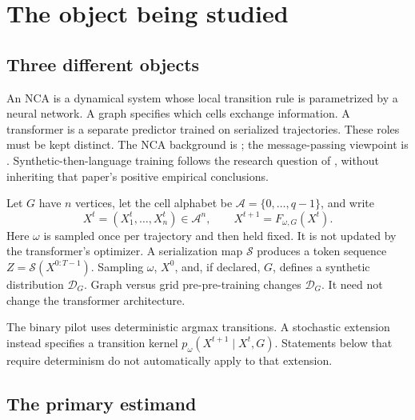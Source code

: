 \section{The object being studied}
\label{sec:problem}

\subsection{Three different objects}

An NCA is a dynamical system whose local transition rule is parametrized by a
neural network. A graph specifies which cells exchange information.
A transformer is a separate predictor trained on serialized trajectories.
These roles must be kept distinct. The NCA background is
\cite{mordvintsev2020}; the message-passing viewpoint is
\cite{gilmer2017}. Synthetic-then-language training follows the research
question of \cite{lee2026}, without inheriting that paper's positive
empirical conclusions.

Let $G$ have $n$ vertices, let the cell alphabet be
$\mathcal A=\{0,\ldots,q-1\}$, and write
\begin{equation}
 X^t=(X_1^t,\ldots,X_n^t)\in\mathcal A^n,\qquad
 X^{t+1}=F_{\omega,G}(X^t).
 \label{eq:dynamics}
\end{equation}
Here $\omega$ is sampled once per trajectory and then held fixed. It is not
updated by the transformer's optimizer. A serialization map $\mathcal S$
produces a token sequence $Z=\mathcal S(X^{0:T-1})$. Sampling
$\omega$, $X^0$, and, if declared, $G$, defines a synthetic distribution
$\mathcal D_G$. Graph versus grid pre-pre-training changes $\mathcal D_G$.
It need not change the transformer architecture.

The binary pilot uses deterministic argmax transitions. A stochastic
extension instead specifies a transition kernel
$p_\omega(X^{t+1}\mid X^t,G)$. Statements below that require determinism
do not automatically apply to that extension.

\subsection{The primary estimand}

